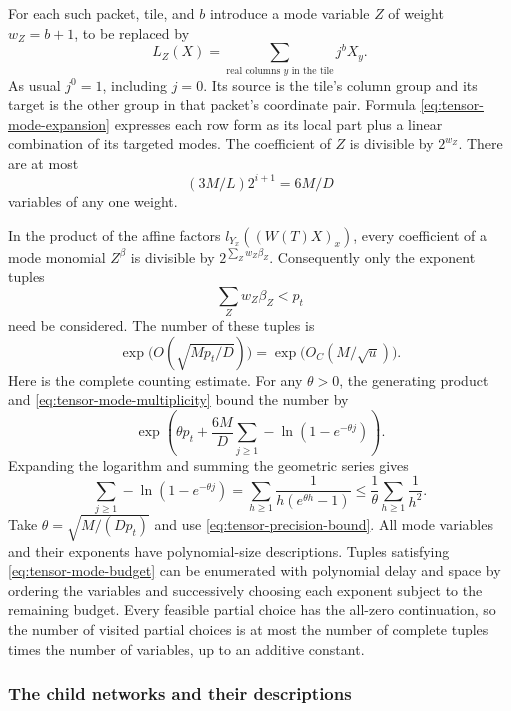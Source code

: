 For each such packet, tile, and $b$ introduce a mode variable $Z$
of weight $w_Z=b+1$, to be replaced by
\[
 L_Z(X)=\sum_{\text{real columns }y\text{ in the tile}}j^bX_y.
\]
As usual $j^0=1$, including $j=0$.
Its source is the tile's column group and its target is the other
group in that packet's coordinate pair.  Formula
\eqref{eq:tensor-mode-expansion} expresses each row form as its
local part plus a linear combination of its targeted modes.
The coefficient of $Z$ is divisible by $2^{w_Z}$.
There are at most
\begin{equation}\label{eq:tensor-mode-multiplicity}
 (3M/L)2^{i+1}=6M/D
\end{equation}
variables of any one weight.

In the product of the affine factors
$l_{Y_x}((W(T)X)_x)$, every coefficient of a mode monomial
$Z^\beta$ is divisible by $2^{\sum_Zw_Z\beta_Z}$.
Consequently only the exponent tuples
\begin{equation}\label{eq:tensor-mode-budget}
 \sum_Zw_Z\beta_Z<p_t
\end{equation}
need be considered.  The number of these tuples is
\begin{equation}\label{eq:tensor-partition-count}
 \exp\bigl(O(\sqrt{Mp_t/D})\bigr)
       =\exp\bigl(O_C(M/\sqrt u)\bigr).
\end{equation}
Here is the complete counting estimate.  For any $\theta>0$,
the generating product and \eqref{eq:tensor-mode-multiplicity}
bound the number by
\[
 \exp\left(\theta p_t+\frac{6M}{D}
                   \sum_{j\ge1}-\ln(1-e^{-\theta j})\right).
\]
Expanding the logarithm and summing the geometric series gives
\[
 \sum_{j\ge1}-\ln(1-e^{-\theta j})
  =\sum_{h\ge1}\frac1{h(e^{\theta h}-1)}
  \le\frac1\theta\sum_{h\ge1}\frac1{h^2}.
\]
Take $\theta=\sqrt{M/(Dp_t)}$ and use
\eqref{eq:tensor-precision-bound}.  All mode variables and their
exponents have polynomial-size descriptions.  Tuples satisfying
\eqref{eq:tensor-mode-budget} can be enumerated with polynomial
delay and space by ordering the variables and successively choosing
each exponent subject to the remaining budget.  Every feasible partial
choice has the all-zero continuation, so the number of visited
partial choices is at most the number of complete tuples times
the number of variables, up to an additive constant.

\subsubsection{The child networks and their descriptions}
\label{subsec:tensor-children}

